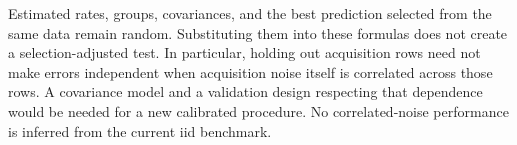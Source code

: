 Estimated rates, groups, covariances, and the best prediction selected from the same data remain random. Substituting them into these formulas does not create a selection-adjusted test. In particular, holding out acquisition rows need not make errors independent when acquisition noise itself is correlated across those rows. A covariance model and a validation design respecting that dependence would be needed for a new calibrated procedure. No correlated-noise performance is inferred from the current iid benchmark.
